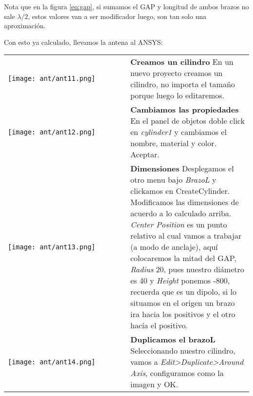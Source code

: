 \documentclass[
	12pt, %
	fleqn, %
	a4paper, %
	oneside, %
]{LegrandOrangeBook}
\begin{document}
\begin{notation}
Nota que en la figura \ref{eq:gap}, si sumamos el GAP y longitud de ambos brazos no sale $\lambda/2$, estos valores van a ser modificador luego, son tan solo una aproximación.
\end{notation}
Con esto ya calculado, llevamos la antena al ANSYS:\\
\begin{tabular}{k{0.5\linewidth}  j{0.5\linewidth}}
        \texttt{[image: ant/ant11.png]} & \textbf{Creamos un cilindro} \newline 
        En un nuevo proyecto creamos un cilindro, no importa el tamaño porque luego lo editaremos. \\
        \texttt{[image: ant/ant12.png]} & \textbf{Cambiamos las propiedades} \newline 
        En el panel de objetos doble click en \textit{cylinder1} y cambiamos el nombre, material y color. Aceptar.\\
        \texttt{[image: ant/ant13.png]} & \textbf{Dimensiones} \newline 
        Desplegamos el otro menu bajo \textit{BrazoL} y clickamos en CreateCylinder. Modificamos las dimensiones de acuerdo a lo calculado arriba. \textit{Center Position} es un punto relativo al cual vamos a trabajar (a modo de anclaje), aquí colocaremos la mitad del GAP, \textit{Radius} 20, pues nuestro diámetro es 40 y \textit{Height} ponemos -800, recuerda que es un dipolo, si lo situamos en el origen un brazo ira hacia los positivos y el otro hacía el positivo.\\
        \texttt{[image: ant/ant14.png]} & \textbf{Duplicamos el brazoL} \newline 
        Seleccionando nuestro cilindro, vamos a \textit{Edit>Duplicate>Around Axis}, configuramos como la imagen y OK.
    \end{tabular}
   
\end{document}
